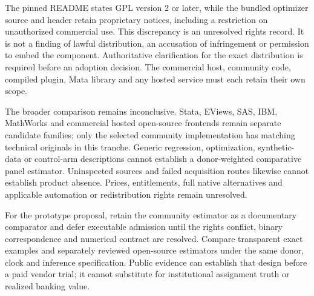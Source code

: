 The pinned README states GPL version 2 or later, while the bundled optimizer
source and header retain proprietary notices, including a restriction on
unauthorized commercial use. This discrepancy is an unresolved rights record.
It is not a finding of lawful distribution, an accusation of infringement or
permission to embed the component. Authoritative clarification for the exact
distribution is required before an adoption decision. The commercial host,
community code, compiled plugin, Mata library and any hosted service must each
retain their own scope.\citep{exec19_synth_stata_source}

The broader comparison remains inconclusive. Stata, EViews, SAS, IBM,
MathWorks and commercial hosted open-source frontends remain separate candidate
families; only the selected community implementation has matching technical
originals in this tranche. Generic regression, optimization, synthetic-data or
control-arm descriptions cannot establish a donor-weighted comparative panel
estimator. Uninspected sources and failed acquisition routes likewise cannot
establish product absence. Prices, entitlements, full native alternatives and
applicable automation or redistribution rights remain unresolved.

For the prototype proposal, retain the community estimator as a documentary
comparator and defer executable admission until the rights conflict, binary
correspondence and numerical contract are resolved. Compare transparent exact
examples and separately reviewed open-source estimators under the same donor,
clock and inference specification. Public evidence can establish that design
before a paid vendor trial; it cannot substitute for institutional assignment
truth or realized banking value.
